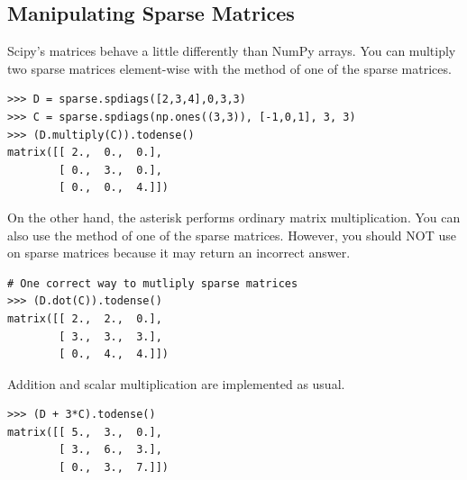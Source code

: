 \subsection*{Manipulating Sparse Matrices} %

Scipy's  matrices behave a little differently than NumPy arrays.
You can multiply two sparse matrices element-wise with the  method of one of the sparse matrices.

\begin{lstlisting}
>>> D = sparse.spdiags([2,3,4],0,3,3)
>>> C = sparse.spdiags(np.ones((3,3)), [-1,0,1], 3, 3)
>>> (D.multiply(C)).todense()
matrix([[ 2.,  0.,  0.],
        [ 0.,  3.,  0.],
        [ 0.,  0.,  4.]])
\end{lstlisting}

On the other hand, the asterisk \li{*} performs ordinary matrix multiplication.
You can also use the  method of one of the sparse matrices.
However, you should NOT use  on sparse matrices because it may return an incorrect answer.

\begin{lstlisting}
# One correct way to mutliply sparse matrices
>>> (D.dot(C)).todense()
matrix([[ 2.,  2.,  0.],
        [ 3.,  3.,  3.],
        [ 0.,  4.,  4.]])
\end{lstlisting}

Addition and scalar multiplication are implemented as usual.

\begin{lstlisting}
>>> (D + 3*C).todense()
matrix([[ 5.,  3.,  0.],
        [ 3.,  6.,  3.],
        [ 0.,  3.,  7.]])
\end{lstlisting}

